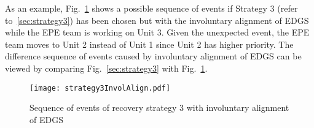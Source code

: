 As an example, Fig.~\ref{fig:strategy3SchemeInvolAlign} shows a possible sequence of events if Strategy 3 
(refer to~\ref{sec:strategy3}) has been chosen but with the involuntary alignment of EDGS while the EPE team
is working on Unit 3. Given the unexpected event, the EPE team moves to Unit 2 instead of Unit 1 since Unit 2
has higher priority. The difference sequence of events caused by involuntary alignment of EDGS can be viewed
by comparing Fig.~\ref{sec:strategy3} with Fig.~\ref{fig:strategy3SchemeInvolAlign}.

\begin{figure}
    \centering
    \centerline{\texttt{[image: strategy3InvolAlign.pdf]}}
    \caption{Sequence of events of recovery strategy 3 with involuntary alignment of EDGS}
    \label{fig:strategy3SchemeInvolAlign}
\end{figure}

